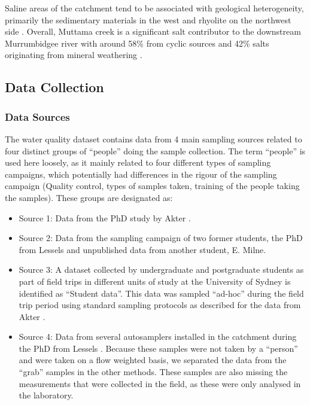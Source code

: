 \documentclass[, manuscript]{copernicus}
\begin{document}
Saline areas of the catchment tend to be associated with geological
heterogeneity, primarily the sedimentary materials in the west and
rhyolite on the northwest side \citep{Conyers2008}. Overall, Muttama
creek is a significant salt contributor to the downstream Murrumbidgee
river with around 58\% from cyclic sources and 42\% salts originating
from mineral weathering \citep{Conyers2008}.

\subsection{Data Collection}

\subsubsection{Data Sources}

The water quality dataset contains data from 4 main sampling sources
related to four distinct groups of ``people'' doing the sample
collection. The term ``people'' is used here loosely, as it mainly
related to four different types of sampling campaigns, which potentially
had differences in the rigour of the sampling campaign (Quality control,
types of samples taken, training of the people taking the samples).
These groups are designated as:

\begin{itemize}
\item
  Source 1: Data from the PhD study by Akter \citeyearpar{Akter2018}.
\item
  Source 2: Data from the sampling campaign of two former students, the
  PhD from Lessels \citeyearpar{Lessels2014} and unpublished data from
  another student, E. Milne.
\item
  Source 3: A dataset collected by undergraduate and postgraduate
  students as part of field trips in different units of study at the
  University of Sydney is identified as ``Student data''. This data was
  sampled ``ad-hoc'' during the field trip period using standard
  sampling protocols as described for the data from Akter
  \citeyearpar{Akter2018}.
\item
  Source 4: Data from several autosamplers installed in the catchment
  during the PhD from Lessels \citeyearpar{Lessels2014}. Because these
  samples were not taken by a ``person'' and were taken on a flow
  weighted basis, we separated the data from the ``grab'' samples in the
  other methods. These samples are also missing the measurements that
  were collected in the field, as these were only analysed in the
  laboratory.
\end{itemize}
\end{document}
